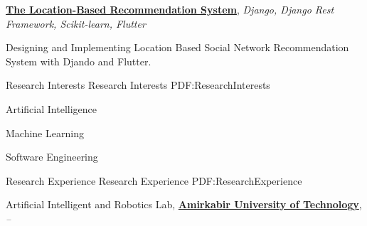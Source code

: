 \documentclass[letterpaper,MMMyyyy,nonstopmode]{resume}
\begin{document}
\begin{Body}
\BigGap
\BulletItem
\href{https://github.com/aliyazdi75/Resume/raw/master/BScThesis-Abstract.pdf}
{\textbf{The Location-Based Recommendation System}},
\textit{\small{Django, Django Rest Framework, Scikit-learn, Flutter}}
\begin{Detail}
\Item
Designing and Implementing Location Based Social Network Recommendation System with Djando and Flutter.
\end{Detail}

\newpage






\Section
{Research Interests}
{Research Interests}
{PDF:ResearchInterests}

\BigGap
\BulletItem
Artificial Intelligence

\Gap
\BulletItem
Machine Learning

\Gap
\BulletItem
Software Engineering


\Section
{Research Experience}
{Research Experience}
{PDF:ResearchExperience}

\Entry
Artificial Intelligent and Robotics Lab,
\href{https://aut.ac.ir}
{\textbf{Amirkabir University of Technology}},
\hfill
\textsl{\small{ -- }}


\end{Body}
\end{document}
